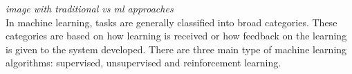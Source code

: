 \emph{image with traditional vs ml approaches}\\

In machine learning, tasks are generally classified into broad categories. These categories are based on how learning is received or how feedback on the learning is given to the system developed.
There are three main type of machine learning algorithms: supervised, unsupervised and reinforcement learning.

